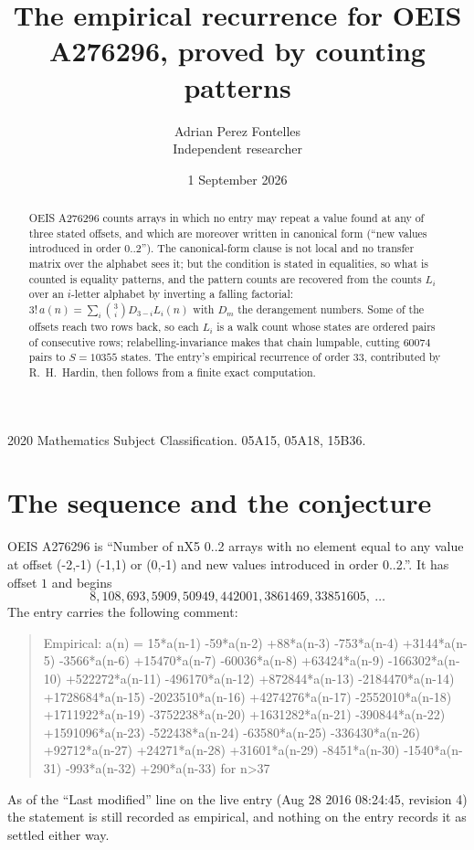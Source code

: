 \documentclass[11pt,a4paper]{article}
\title{The empirical recurrence for OEIS A276296, proved by counting patterns}
\author{Adrian Perez Fontelles\\ \small Independent researcher}
\date{1 September 2026}
\theoremstyle{plain}
\theoremstyle{definition}
\begin{document}
\maketitle

\begin{abstract}
OEIS A276296 counts arrays in which no entry may repeat a value found at any of three stated
offsets, and which are moreover written in canonical form (``new values introduced in order
$0..2$''). The canonical-form clause is not local and no transfer matrix over the
alphabet sees it; but the condition is stated in equalities, so what is counted is equality
patterns, and the pattern counts are recovered from the counts $L_i$ over an $i$-letter
alphabet by inverting a falling factorial:
$3!\,a(n)=\sum_i\binom{3}{i}D_{3-i}L_i(n)$ with $D_m$ the derangement numbers.
Some of the offsets reach two rows back, so each $L_i$ is a walk count whose states are
ordered pairs of consecutive rows; relabelling-invariance makes that chain lumpable,
cutting $60074$ pairs to $S=10355$ states. The entry's empirical recurrence of order $33$,
contributed by R.~H.~Hardin, then follows from a finite exact computation.
\end{abstract}

\noindent\small 2020 Mathematics Subject Classification. 05A15, 05A18, 15B36.\normalsize

\section{The sequence and the conjecture}

OEIS A276296 is ``Number of nX5 0..2 arrays with no element equal to any value at offset (-2,-1) (-1,1) or (0,-1) and new values introduced in order 0..2.''. It has offset $1$ and begins
\[
8, 108, 693, 5909, 50949, 442001, 3861469, 33851605,\ \dots
\]
The entry carries the following comment:
\begin{quote}\small
Empirical: a(n) = 15*a(n-1) -59*a(n-2) +88*a(n-3) -753*a(n-4) +3144*a(n-5) -3566*a(n-6) +15470*a(n-7) -60036*a(n-8) +63424*a(n-9) -166302*a(n-10) +522272*a(n-11) -496170*a(n-12) +872844*a(n-13) -2184470*a(n-14) +1728684*a(n-15) -2023510*a(n-16) +4274276*a(n-17) -2552010*a(n-18) +1711922*a(n-19) -3752238*a(n-20) +1631282*a(n-21) -390844*a(n-22) +1591096*a(n-23) -522438*a(n-24) -63580*a(n-25) -336430*a(n-26) +92712*a(n-27) +24271*a(n-28) +31601*a(n-29) -8451*a(n-30) -1540*a(n-31) -993*a(n-32) +290*a(n-33) for n>37
\end{quote}
As of the ``Last modified'' line on the live entry (Aug 28 2016 08:24:45, revision 4) the statement is
still recorded as empirical, and nothing on the entry records it as settled either way.
\end{document}
